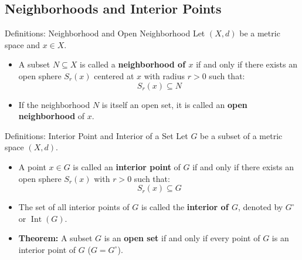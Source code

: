 \documentclass[11pt,a4paper]{article}
\begin{document}
\newpage

\subsection{Neighborhoods and Interior Points}

\begin{defbox}{Definitions: Neighborhood and Open Neighborhood}
Let $(X, d)$ be a metric space and $x \in X$.
\begin{itemize}
    \item A subset $N \subseteq X$ is called a \textbf{neighborhood of $x$} if and only if there exists an open sphere $S_r(x)$ centered at $x$ with radius $r > 0$ such that:
    \begin{equation}
        S_r(x) \subseteq N
    \end{equation}
    \item If the neighborhood $N$ is itself an open set, it is called an \textbf{open neighborhood} of $x$.
\end{itemize}
\end{defbox}

\begin{defbox}{Definitions: Interior Point and Interior of a Set}
Let $G$ be a subset of a metric space $(X, d)$.
\begin{itemize}
    \item A point $x \in G$ is called an \textbf{interior point} of $G$ if and only if there exists an open sphere $S_r(x)$ with $r > 0$ such that:
    \begin{equation}
        S_r(x) \subseteq G
    \end{equation}
    \item The set of all interior points of $G$ is called the \textbf{interior of $G$}, denoted by $G^\circ$ or $\operatorname{Int}(G)$.
    \item \textbf{Theorem:} A subset $G$ is an \textbf{open set} if and only if every point of $G$ is an interior point of $G$ ($G = G^\circ$).
\end{itemize}
\end{defbox}
\end{document}
